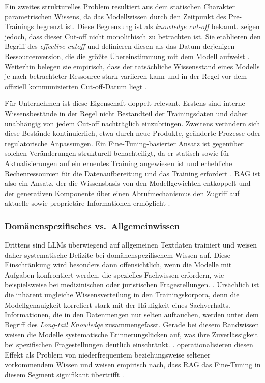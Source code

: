 Ein zweites strukturelles Problem resultiert aus dem statischen Charakter parametrischen Wissens, da das Modellwissen durch den Zeitpunkt des Pre-Trainings begrenzt ist. Diese Begrenzung ist als \textit{knowledge cut-off} bekannt. \textcite[1]{Cheng.2024} zeigen jedoch, dass dieser Cut-off nicht monolithisch zu betrachten ist. Sie etablieren den Begriff des \textit{effective cutoff} und definieren diesen als das Datum derjenigen Ressourcenversion, die die größte Übereinstimmung mit dem Modell aufweist \autocite[3]{Cheng.2024}. Weiterhin belegen sie empirisch, dass der tatsächliche Wissensstand eines Modells je nach betrachteter Ressource stark variieren kann und in der Regel vor dem offiziell kommunizierten Cut-off-Datum liegt \autocite[1]{Cheng.2024}.

Für Unternehmen ist diese Eigenschaft doppelt relevant. Erstens sind interne Wissensbestände  in der Regel nicht Bestandteil der Trainingsdaten und daher unabhängig von jedem Cut-off  nachträglich einzubringen. Zweitens verändern sich diese Bestände kontinuierlich, etwa durch  neue Produkte, geänderte Prozesse oder regulatorische Anpassungen. Ein Fine-Tuning-basierter Ansatz ist gegenüber solchen Veränderungen strukturell benachteiligt, da er statisch sowie für Aktualisierungen auf ein erneutes Training angewiesen ist und erhebliche Rechenressourcen für die Datenaufbereitung und das Training erfordert \autocite[5]{Gao.2024}. 
RAG ist also ein Ansatz, der die Wissensbasis von den Modellgewichten entkoppelt und der generativen Komponente über einen Abrufmechanismus den Zugriff auf aktuelle sowie proprietäre Informationen ermöglicht \autocite[3]{Karakurt.2026}.

\subsubsection{Domänenspezifisches vs.\ Allgemeinwissen}
\label{sec:domaenenwissen}

Drittens sind LLMs überwiegend auf allgemeinen Textdaten trainiert und weisen daher systematische Defizite bei domänenspezifischem Wissen auf. Diese Einschränkung wird besonders dann offensichtlich, wenn die Modelle mit Aufgaben konfrontiert werden, die spezielles Fachwissen erfordern, wie beispielsweise bei medizinischen oder juristischen Fragestellungen. \autocite[1:9]{Huang.2024}. Ursächlich ist die inhärent ungleiche Wissensverteilung in den Trainingskorpora, denn die Modellgenauigkeit korreliert stark mit der Häufigkeit eines Sachverhalts. Informationen, die in den Datenmengen nur selten auftauchen, werden unter dem Begriff des \textit{Long-tail Knowledge} zusammengefasst. Gerade bei diesem Randwissen weisen die Modelle systematische Erinnerungslücken auf, was ihre Zuverlässigkeit bei spezifischen Fragestellungen deutlich einschränkt. \autocite[1:9]{Huang.2024}. 
\textcite[1]{Soudani.2024} operationalisieren diesen Effekt als Problem von niederfrequentem beziehungsweise seltener vorkommendem Wissen und weisen empirisch nach, dass RAG das Fine-Tuning in diesem Segment signifikant übertrifft \autocite[2]{Soudani.2024}.

